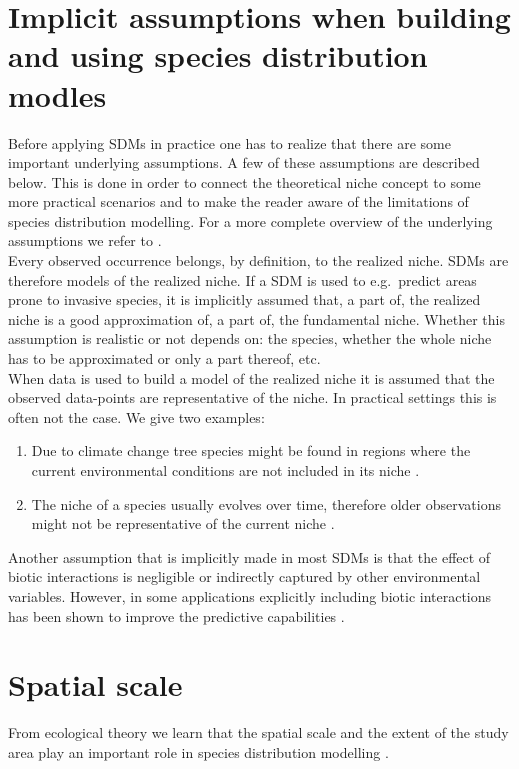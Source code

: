 \section{Implicit assumptions when building and using species distribution modles}
\label{sec:chTheEcologicalNicheConcept:NicheEquilibrium}
Before applying SDMs in practice one has to realize that there are some important underlying assumptions. A few of these assumptions are described below. This is done in order to connect the theoretical niche concept to some more practical scenarios and to make the reader aware of the limitations of species distribution modelling. For a more complete overview of the underlying assumptions we refer to \cite{wiens_niches_2009}.\\

Every observed occurrence belongs, by definition, to the realized niche. SDMs are therefore models of the realized niche. If a SDM is used to e.g.\ predict areas prone to invasive species, it is implicitly assumed that, a part of, the realized niche is a good approximation of, a part of, the fundamental niche. Whether this assumption is realistic or not depends on: the species, whether the whole niche has to be approximated or only a part thereof, etc.\\

When data is used to build a model of the realized niche it is assumed that the observed data-points are representative of the niche. In practical settings this is often not the case. We give two examples:
\begin{enumerate}
\item Due to climate change tree species might be found in regions where the current environmental conditions are not included in its niche \parencite{woodward_impact_1990}.
\item The niche of a species usually evolves over time, therefore older observations might not be representative of the current niche \parencite{pearson_predicting_2003}.
\end{enumerate}

Another assumption that is implicitly made in most SDMs is that the effect of biotic interactions is negligible or indirectly captured by other environmental variables. However, in some applications explicitly including biotic interactions has been shown to improve the predictive capabilities \parencite[e.g.][]{heikkinen_biotic_2007}. \\


\section{Spatial scale}
\label{sec:SpatialScale}
From ecological theory we learn that the spatial scale and the extent of the study area play an important role in species distribution modelling \parencite{pearson_predicting_2003, pearson_modelling_2004}. \\

